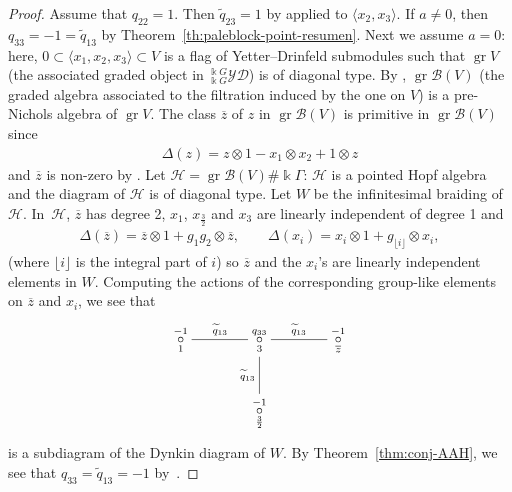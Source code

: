 \documentclass[10pt,a4paper]{amsart}
\numberwithin{equation}{section}
\newcommand{\gr}{\operatorname{gr}}
\newcommand{\toba}{\mathscr B}
\newcommand{\yd}[1]{{}_{#1}^{#1}\mathcal{YD}}
\newcommand{\tresdos}{\frac{3}{2}}
\begin{document}
\begin{proof}
Assume that $q_{22} = 1$.
Then $\widetilde{q}_{23} = 1$ by \cite[Lemma~2.3.7]{AAH-triang} applied to $\langle x_2, x_3\rangle$.
If $a\ne 0$, then $q_{33} = -1 = \widetilde{q}_{13}$ by Theorem~\ref{th:paleblock-point-resumen}.
Next we assume $a = 0$: here, $0 \subset \langle x_1, x_2, x_3\rangle \subset V$ is a flag of Yetter--Drinfeld submodules
such that $\gr V$ (the associated graded object in $\yd{\Bbbk G}$) is of diagonal type. By \cite[Lemma~3.4.2\,(b)]{AAH-triang},
$\gr \toba(V)$ (the graded algebra associated to the filtration induced by the one on $V$) is a pre-Nichols algebra of $\gr V$.
The class $\overline{z}$ of $z$ in $\gr \toba(V)$ is primitive in $\gr \toba(V)$ since
\begin{align*}
\Delta(z) =z\otimes 1 -x_1\otimes x_2 + 1\otimes z
\end{align*}
and $\overline{z}$ is non-zero by \cite[Propositions 8.1.6 and~8.1.7]{AAH-triang}. Let $\mathcal{H}=\gr \toba(V)\#\Bbbk\Gamma$: $\mathcal{H}$ is a pointed Hopf algebra and the diagram of $\mathcal{H}$ is of diagonal type. Let $W$ be the infinitesimal braiding of~$\mathcal{H}$. In~$\mathcal{H}$, $\overline{z}$ has degree 2, $x_1$, $x_{\tresdos}$ and $x_3$ are linearly independent of degree 1 and
\begin{align*}
\Delta(\overline{z}) =\overline{z}\otimes 1+g_1g_2 \otimes \overline{z},\qquad
\Delta(x_i)=x_i\otimes 1+g_{\lfloor i \rfloor}\otimes x_i,
\end{align*}
(where $\lfloor i\rfloor$ is the integral part of $i$) so $\overline{z}$ and the $x_i$'s are linearly independent elements in $W$.
Computing the actions of the corresponding group-like elements on $\overline{z}$ and $x_i$, we see that
$$
\xymatrix@C=40pt{\overset{-1}{\underset{1}{\circ}} \ar@{-}[r]^{\widetilde{q}_{13}} & \overset{q_{33}}{\underset{3}{\circ}} \ar@{-}[d]_{\widetilde{q}_{13}} \ar @{-}[r]^{\widetilde{q}_{13}} & \overset{-1}{\underset{\overline{z}}{\circ}}
\\ & \overset{-1}{\underset{\tresdos}{\circ}} &}
$$
is a subdiagram of the Dynkin diagram of $W$.
By Theorem~\ref{thm:conj-AAH}, we see that $q_{33}=\widetilde{q}_{13} =-1$ by~\cite{H-classif-RS}.


\end{proof}
\end{document}
